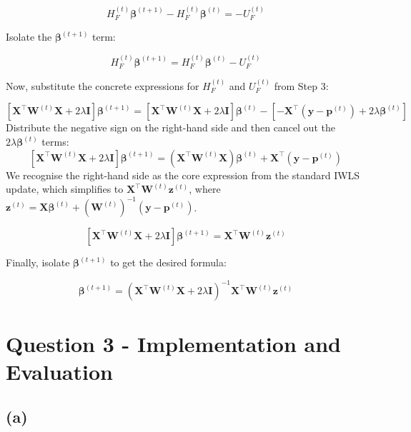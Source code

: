 \documentclass[12pt,halfline,a4paper,]{ouparticle}
\begin{document}
\[H_F^{(t)} \boldsymbol{\beta}^{(t+1)} - H_F^{(t)} \boldsymbol{\beta}^{(t)} = - U_F^{(t)}\]

Isolate the \(\boldsymbol{\beta}^{(t+1)}\) term:

\[H_F^{(t)} \boldsymbol{\beta}^{(t+1)} = H_F^{(t)} \boldsymbol{\beta}^{(t)} - U_F^{(t)}\]

Now, substitute the concrete expressions for \(H_F^{(t)}\) and
\(U_F^{(t)}\) from Step 3:

\[[\mathbf{X}^\top \mathbf{W}^{(t)} \mathbf{X} + 2\lambda\mathbf{I}] \boldsymbol{\beta}^{(t+1)} = [\mathbf{X}^\top \mathbf{W}^{(t)} \mathbf{X} + 2\lambda\mathbf{I}] \boldsymbol{\beta}^{(t)} - \left[ -\mathbf{X}^\top (\mathbf{y} - \mathbf{p}^{(t)}) + 2\lambda\boldsymbol{\beta}^{(t)} \right]\]
Distribute the negative sign on the right-hand side and then cancel out
the \(2\lambda\boldsymbol{\beta}^{(t)}\) terms: \[
[\mathbf{X}^\top \mathbf{W}^{(t)} \mathbf{X} + 2\lambda\mathbf{I}] \boldsymbol{\beta}^{(t+1)} = (\mathbf{X}^\top \mathbf{W}^{(t)} \mathbf{X})\boldsymbol{\beta}^{(t)} + \mathbf{X}^\top (\mathbf{y} - \mathbf{p}^{(t)})
\] We recognise the right-hand side as the core expression from the
standard IWLS update, which simplifies to
\(\mathbf{X}^\top \mathbf{W}^{(t)} \mathbf{z}^{(t)}\), where
\(\mathbf{z}^{(t)} = \mathbf{X}\boldsymbol{\beta}^{(t)} + (\mathbf{W}^{(t)})^{-1} (\mathbf{y} - \mathbf{p}^{(t)})\).

\[[\mathbf{X}^\top \mathbf{W}^{(t)} \mathbf{X} + 2\lambda\mathbf{I}] \boldsymbol{\beta}^{(t+1)} = \mathbf{X}^\top \mathbf{W}^{(t)} \mathbf{z}^{(t)}\]

Finally, isolate \(\boldsymbol{\beta}^{(t+1)}\) to get the desired
formula:

\[\boldsymbol{\beta}^{(t+1)} = (\mathbf{X}^\top \mathbf{W}^{(t)} \mathbf{X} + 2\lambda\mathbf{I})^{-1} \mathbf{X}^\top \mathbf{W}^{(t)} \mathbf{z}^{(t)}\]

\newpage

\section{Question 3 - Implementation and
Evaluation}\label{question-3---implementation-and-evaluation}

\subsection{(a)}\label{a-2}
\end{document}
